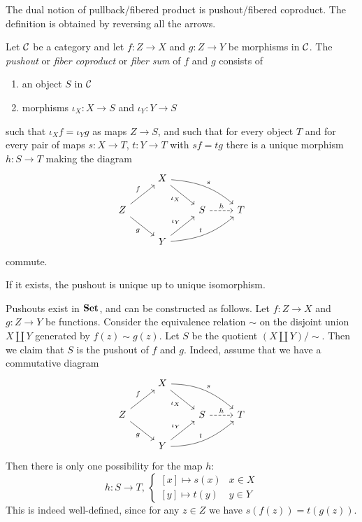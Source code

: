 The dual notion of pullback/fibered product is pushout/fibered coproduct. The definition is obtained by reversing all the arrows.

\begin{definition}
Let ${\mathcal{C}}$ be a category and let  $f\colon Z\to X$ and $g\colon Z\to Y$ be morphisms in ${\mathcal{C}}$. The \emph{pushout} or \emph{fiber coproduct} or \emph{fiber sum} of $f$ and $g$ consists of 
\begin{enumerate}
\item an object $S$ in ${\mathcal{C}}$
\item morphisms $\iota_X\colon X \to S$ and $\iota_Y\colon Y \to S$
\end{enumerate}
such that $\iota_Xf=\iota_Yg$ as maps $Z\to S$, and such that for every object $T$ and for every pair of maps $s\colon X\to T$, $t\colon Y\to T$ with $sf=tg$
there is a unique morphism $h\colon S\to T$ making the diagram
\[
\begin{tikzcd}
&X \arrow[swap]{rd}{\iota_X} \arrow[out=-5,in=140]{rrd}{s} & & \\
Z \arrow{ru}{f} \arrow[swap]{rd}{g} && S \arrow[dashed]{r}{h} & T \\
 & Y \arrow{ru}{\iota_Y} \arrow[out=5,in=-140]{rru}{t} & & 
\end{tikzcd}
\]
commute.
\end{definition}

If it exists, the pushout is unique up to unique isomorphism. 
 
\begin{example}Pushouts exist in $\mathbf{Set}$, and can be constructed as follows. Let $f\colon Z\to X$ and $g\colon Z\to Y$ be functions. Consider the equivalence relation $\sim$ on the disjoint union $X\amalg Y$ generated by $f(z) \sim g(z)$. Let $S$ be the quotient $(X\amalg Y)/\sim$. Then we claim that $S$ is the pushout of $f$ and $g$. Indeed, assume that we have a commutative diagram
\[
\begin{tikzcd}
&X \arrow[swap]{rd}{\iota_X} \arrow[out=-1,in=140]{rrd}{s} & & \\
Z \arrow{ru}{f} \arrow[swap]{rd}{g} && S \arrow[dashed]{r}{h} & T \\
 & Y \arrow{ru}{\iota_Y} \arrow[out=1,in=-140]{rru}{t} & & 
\end{tikzcd}
\]
Then there is only one possibility for the map $h$:
\[
	h\colon S \to T,\,
	\begin{cases} [x] \mapsto s(x) & x\in X \\ [y] \mapsto t(y) & y\in Y
	\end{cases}
\]
This is indeed well-defined, since for any $z\in Z$ we have $s(f(z))=t(g(z))$.
\end{example}

